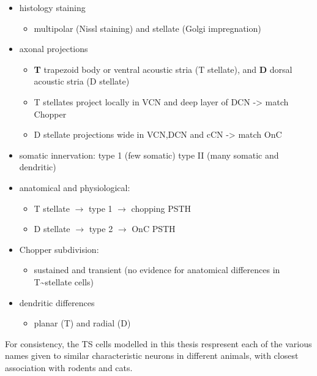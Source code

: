 \begin{itemize}
\item histology staining \citep{Lorente:1933}
\begin{itemize}
\item multipolar (Nissl staining) and stellate (Golgi impregnation) \citep{Osen:1969,BrawerMorestEtAl:1974,Lorente:1981}
\end{itemize}
\item axonal projections
\begin{itemize}
\item \textbf{T} trapezoid body or ventral acoustic stria (T stellate), and \textbf{D} dorsal acoustic stria (D stellate) \citep{OertelWuEtAl:1990}
\item T stellates project locally in VCN and deep layer of DCN -> match Chopper \citep{RhodeOertelEtAl:1983,SmithRhode:1989}
\item D stellate projections wide in VCN,DCN and cCN -> match OnC  \citep{SmithRhode:1989}
\end{itemize}
\item somatic innervation: type 1 (few somatic) type II (many somatic and dendritic) \citep{Cant:1981}
\item anatomical and physiological: \citet{SmithRhode:1989}
\begin{itemize}
\item T stellate $\rightarrow$ type 1 $\rightarrow$ chopping PSTH
\item D stellate $\rightarrow$ type 2 $\rightarrow$ OnC PSTH
\end{itemize}
\item Chopper subdivision:
\begin{itemize}
\item sustained and transient (no evidence for anatomical differences in T\~{}stellate cells)
\end{itemize}
\item dendritic differences \citep{DoucetRyugo:1997,DoucetRyugo:2006}
\begin{itemize}
\item planar (T) and radial (D)
\end{itemize}
\end{itemize}

For consistency, the TS cells modelled in this thesis respresent each of the various names given to similar characteristic neurons in different animals, with closest association with rodents and cats. 



